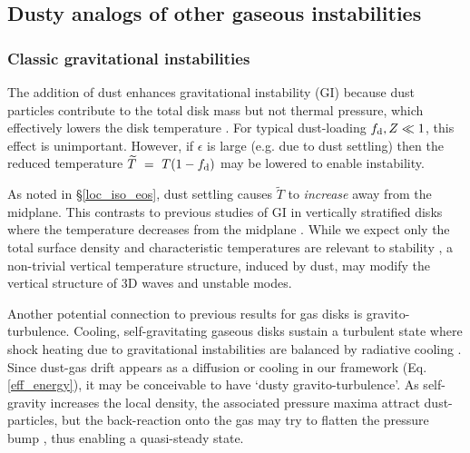 



\subsection{Dusty analogs of other gaseous instabilities}  


\subsubsection{Classic gravitational instabilities} %
The addition of dust enhances gravitational
instability (GI) because dust particles contribute to the
total disk mass but not thermal pressure, which effectively lowers the
disk temperature \citep[][]{thompson88,shi13}. For typical dust-loading 
$f_\mathrm{d}, Z\ll1$, this effect is unimportant. However, if $\epsilon$ is
large (e.g. due to dust settling) then the reduced temperature
$\widetilde{T}~=~T(1 - f_\mathrm{d})$ may be lowered to enable instability.  

As noted in \S\ref{loc_iso_eos}, dust settling causes 
$\widetilde{T}$ to \emph{increase} away from the midplane. This contrasts
to previous studies of GI in vertically stratified disks
 where the temperature decreases
from the midplane \citep[e.g.][]{mamat10, kim12,lin14c}. 
While we expect only the total surface density and
characteristic temperatures are relevant to stability  
\citep{toomre64}, a non-trivial vertical temperature
structure, induced by dust, may modify the vertical structure of 3D
waves and unstable modes. 

Another potential connection to previous results for gas disks is  
gravito-turbulence. Cooling, self-gravitating gaseous disks 
sustain a turbulent state where shock heating due to gravitational 
instabilities are balanced by radiative cooling 
\citep{gammie01}. Since dust-gas drift appears as a diffusion or 
cooling in our framework (Eq. \ref{eff_energy}), it may be conceivable
to have `dusty gravito-turbulence'. As self-gravity increases the
local density, the associated pressure maxima attract dust-particles,
but the back-reaction onto the gas may try to flatten the pressure
bump \citep{taki16}, thus enabling a quasi-steady state. 

